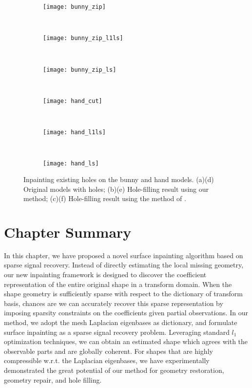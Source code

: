 \begin{figure}
\centering
    \begin{subfigure}[b]{0.33\linewidth}
        \texttt{[image: bunny\_zip]}
        \caption{}
    \end{subfigure}%
    ~
    \begin{subfigure}[b]{0.33\linewidth}
        \texttt{[image: bunny\_zip\_l1ls]}
        \caption{}
    \end{subfigure}%
    ~
    \begin{subfigure}[b]{0.33\linewidth}
        \texttt{[image: bunny\_zip\_ls]}
        \caption{}
    \end{subfigure}
    \\
    \begin{subfigure}[b]{0.33\linewidth}
        \texttt{[image: hand\_cut]}
        \caption{}
    \end{subfigure}%
    ~
    \begin{subfigure}[b]{0.33\linewidth}
        \texttt{[image: hand\_l1ls]}
        \caption{}
    \end{subfigure}%
    ~
    \begin{subfigure}[b]{0.33\linewidth}
        \texttt{[image: hand\_ls]}
        \caption{}
    \end{subfigure}
\caption{Inpainting existing holes on the bunny and hand models. (a)(d) Original models with holes;
        (b)(e) Hole-filling result using our method;
        (c)(f) Hole-filling result using the method of \cite{Bac2008}.}
\label{fig:holefilling2}
\end{figure}

\section{Chapter Summary}
In this chapter, we have proposed a novel surface inpainting algorithm based on sparse signal recovery.
Instead of directly estimating the local missing geometry, our new inpainting framework is designed to
discover the coefficient representation of the entire original shape in a transform domain.
When the shape geometry is sufficiently sparse with respect to the dictionary of transform basis, chances are we
can accurately recover this sparse representation by imposing sparsity constraints on the coefficients given partial observations.
In our method, we adopt the mesh Laplacian eigenbases as dictionary, and formulate surface inpainting as a sparse
signal recovery problem. Leveraging standard $l_1$ optimization techniques, we can obtain an estimated shape which agrees with the
observable parts and are globally coherent. For shapes that are highly compressible w.r.t. the Laplacian eigenbases, we have experimentally
demonstrated the great potential of our method for geometry restoration, geometry repair, and hole filling.

